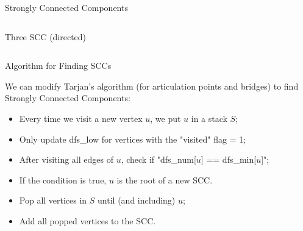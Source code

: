 \begin{frame}{Strongly Connected Components}
\begin{columns}[t]
\begin{exampleblock}{Three SCC (directed)}
\begin{center}
      \end{center}
      \vspace{0.1cm}
    \end{exampleblock}
  \end{columns}
\end{frame}

\begin{frame}{Algorithm for Finding SCCs}

  We can modify Tarjan's algorithm (for articulation points and bridges) to find Strongly Connected Components:\bigskip

  \begin{block}{}
  \begin{itemize}
    \item Every time we visit a new vertex $u$, we put $u$ in a stack $S$;
    \item Only update dfs\_low for vertices with the "visited" flag = 1;
    \item After visiting all edges of $u$, check if "dfs\_num[$u$] == dfs\_min[$u$]";
    \item If the condition is true, $u$ is the root of a new SCC.
    \item Pop all vertices in $S$ until (and including) $u$;
    \item Add all popped vertices to the SCC.
  \end{itemize}
  \end{block}
\end{frame}

